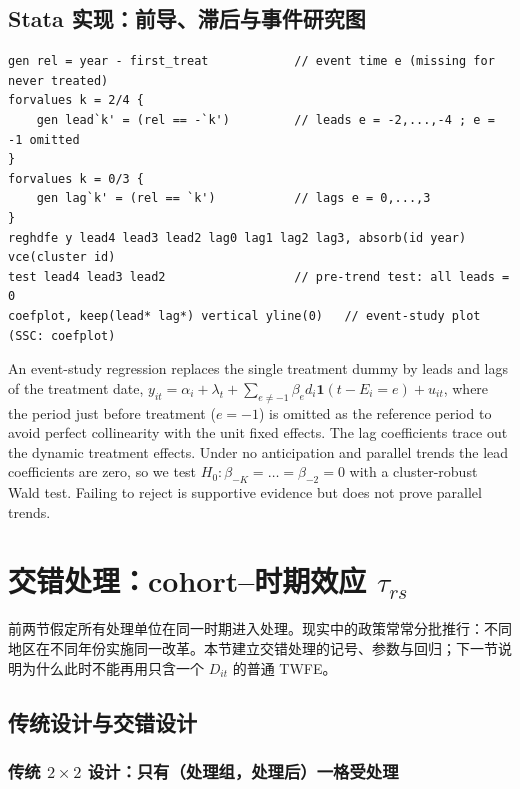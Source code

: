 \subsection{Stata 实现：前导、滞后与事件研究图}

\begin{lstlisting}
gen rel = year - first_treat            // event time e (missing for never treated)
forvalues k = 2/4 {
    gen lead`k' = (rel == -`k')         // leads e = -2,...,-4 ; e = -1 omitted
}
forvalues k = 0/3 {
    gen lag`k' = (rel == `k')           // lags e = 0,...,3
}
reghdfe y lead4 lead3 lead2 lag0 lag1 lag2 lag3, absorb(id year) vce(cluster id)
test lead4 lead3 lead2                  // pre-trend test: all leads = 0
coefplot, keep(lead* lag*) vertical yline(0)   // event-study plot (SSC: coefplot)
\end{lstlisting}

\begin{english}
An event-study regression replaces the single treatment dummy by leads and lags of the treatment date, $y_{it}=\alpha_i+\lambda_t+\sum_{e\neq-1}\beta_ed_i\mathbf{1}(t-E_i=e)+u_{it}$, where the period just before treatment ($e=-1$) is omitted as the reference period to avoid perfect collinearity with the unit fixed effects. The lag coefficients trace out the dynamic treatment effects. Under no anticipation and parallel trends the lead coefficients are zero, so we test $H_0:\beta_{-K}=\dots=\beta_{-2}=0$ with a cluster-robust Wald test. Failing to reject is supportive evidence but does not prove parallel trends.
\end{english}

\section{交错处理：cohort--时期效应 \texorpdfstring{$\tau_{rs}$}{tau\_rs}}\label{sec:U15b-stag}

前两节假定所有处理单位在同一时期进入处理。现实中的政策常常分批推行：不同地区在不同年份实施同一改革。本节建立交错处理的记号、参数与回归；下一节说明为什么此时不能再用只含一个 $D_{it}$ 的普通 TWFE。

\subsection{传统设计与交错设计}

\subsubsection{传统 \texorpdfstring{$2\times2$}{2x2} 设计：只有（处理组，处理后）一格受处理}

